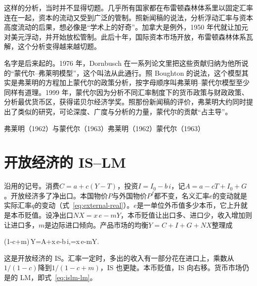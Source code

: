 这样的分析，当时并不显得切题。几乎所有国家都在布雷顿森林体系里以固定汇率连在一起，资本的流动又受到广泛的管制\cite{nobel1999}。照新闻稿的说法，分析浮动汇率与资本高度流动的后果，想必像是“学术上的好奇”\cite{nobel1999}。加拿大是例外，1950 年代就让加元对美元浮动，并开始放松管制\cite{nobel1999}。此后十年，国际资本市场开放，布雷顿森林体系瓦解，这个分析变得越来越切题\cite{nobel1999}。

名字是后来起的。1976 年，Dornbusch 在一系列论文里把这些贡献归纳为他所说的“蒙代尔–弗莱明模型”，这个叫法从此通行\cite{boughton2003}。照 Boughton 的说法，这个模型其实是弗莱明的方程加上蒙代尔的政策分析，按字母顺序叫弗莱明–蒙代尔模型至少同样有道理\cite{boughton2003}。1999 年，蒙代尔因为分析不同汇率制度下的货币政策与财政政策、分析最优货币区，获得诺贝尔经济学奖\cite{nobel1999}。照那份新闻稿的评价，弗莱明大约同时提出了类似的研究，可论深度、广度与分析的力量，蒙代尔的贡献“占主导”\cite{nobel1999}。

\begin{compare}{弗莱明（1962）与蒙代尔（1963）}{弗莱明（1962）}{蒙代尔（1963）}
\end{compare}

\section{开放经济的 IS–LM}\label{sec:mundell-model}

沿用的记号。消费$C=a+c(Y-T)$，投资$I=I_0-b\,i$，记$A=a-cT+I_0+G$。开放经济多了净出口。本国物价$P$与外国物价$P^{f}$都不变，名义汇率$e$的变动就是实际汇率$q$的变动（式~\eqref{eq:external-real}）。$e$是一单位外币值多少本币，它上升就是本币贬值。设净出口$\mathit{NX}=x\,e-mY$，本币贬值让出口多、进口少，收入增加则让进口多，$m$是边际进口倾向。产品市场的均衡$Y=C+I+G+\mathit{NX}$整理成
\begin{keyeq}
(1-c+m)\,Y=A+x\,e-b\,i,\qquad {}=x\,e-mY.\label{eq:mundell-is}
\end{keyeq}
这是开放经济的 IS。汇率一定时，多出的收入有一部分花在进口上，乘数从$1/(1-c)$降到$1/(1-c+m)$，IS 也更陡。本币贬值，IS 向右移。货币市场仍是的 LM，即式~\eqref{eq:islm-lm}。

